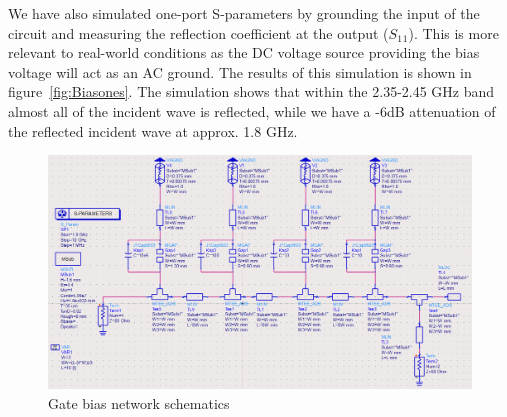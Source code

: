   We have also simulated one-port S-parameters by grounding the input of the circuit and measuring the reflection coefficient at the output ($S_1$$_1$). This is more relevant to real-world conditions as the DC voltage source providing the bias voltage will act as an AC ground. The results of this simulation is shown in figure~\ref{fig:Biasones}. The simulation shows that within the 2.35-2.45 GHz band almost all of the incident wave is reflected, while we have a -6dB attenuation of the reflected incident wave at approx. 1.8 GHz.

  \clearpage


  \begin{figure}[h]
  	  \centering
	  \includegraphics[width=\textwidth]{img/Bias_filter_two_port}
  	  \caption{Gate bias network schematics}
  	  \label{fig:Biasschem}
  \end{figure}


